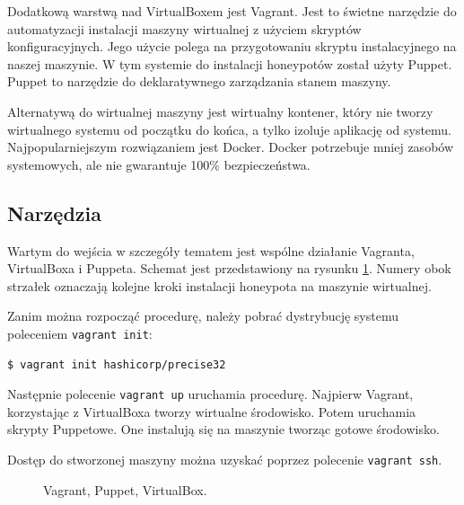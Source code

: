 \documentclass[runningheads,a4paper]{llncs}
\begin{document}
Dodatkową warstwą nad VirtualBoxem jest Vagrant. Jest to świetne narzędzie do automatyzacji instalacji maszyny wirtualnej z użyciem skryptów konfiguracyjnych. Jego użycie polega na przygotowaniu skryptu instalacyjnego na naszej maszynie. W tym systemie do instalacji honeypotów został użyty Puppet. Puppet to narzędzie do deklaratywnego zarządzania stanem maszyny.

Alternatywą do wirtualnej maszyny jest wirtualny kontener, który nie tworzy wirtualnego systemu od początku do końca, a tylko izoluje aplikację od systemu. Najpopularniejszym rozwiązaniem jest Docker. Docker potrzebuje mniej zasobów systemowych, ale nie gwarantuje 100\% bezpieczeństwa.

\subsection{Narzędzia}

Wartym do wejścia w szczegóły tematem jest wspólne działanie Vagranta, VirtualBoxa i Puppeta. Schemat jest przedstawiony na rysunku \ref{fig:vagrant_fig}. Numery obok strzałek oznaczają kolejne kroki instalacji honeypota na maszynie wirtualnej.

Zanim można rozpocząć procedurę, należy pobrać dystrybucję systemu poleceniem \texttt{vagrant init}:
\begin{lstlisting}
$ vagrant init hashicorp/precise32
\end{lstlisting}

Następnie polecenie \texttt{vagrant up} uruchamia procedurę. Najpierw Vagrant, korzystając z VirtualBoxa tworzy wirtualne środowisko. Potem uruchamia skrypty Puppetowe. One instalują się na maszynie tworząc gotowe środowisko.

Dostęp do stworzonej maszyny można uzyskać poprzez polecenie \texttt{vagrant ssh}.

\begin{figure}
        \centering
        \caption{Vagrant, Puppet, VirtualBox.}
        \label{fig:vagrant_fig}
\end{figure}
\end{document}
